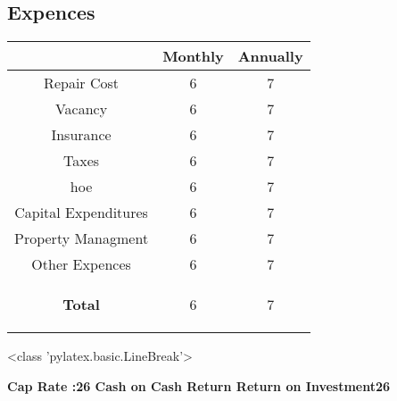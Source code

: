 \documentclass{article}%
\begin{document}
%
\subsection{\textbf{Expences}}%
\label{subsec:textbfExpences}%
\begin{tabular}{|c|c|c|}%
\hline%
   &Monthly&Annually\\%
\hline%
Repair Cost&6&7\\%
\hline%
Vacancy&6&7\\%
\hline%
Insurance&6&7\\%
\hline%
Taxes&6&7\\%
\hline%
hoe&6&7\\%
\hline%
Capital Expenditures&6&7\\%
\hline%
Property Managment&6&7\\%
\hline%
Other Expences&6&7\\%
\hline%
\begin{Large}%
\textbf{Total}%
\end{Large}&6&7\\%
\hline%
\end{tabular}

%
<class 'pylatex.basic.LineBreak'>

%
\begin{Large}%
\textbf{Cap Rate :26\newline%
\newline%
Cash on Cash Return\newline%
\newline%
Return on Investment26}%
\end{Large}%
\end{document}
